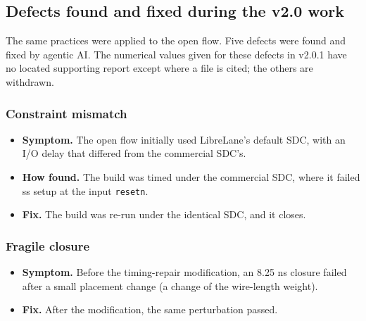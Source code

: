 \documentclass[11pt,letterpaper]{article}
\newcommand{\sk}[1]{\texttt{#1}}
\renewcommand{\_}{\textunderscore\penalty0\hskip0pt\relax}
\begin{document}
\subsection*{Defects found and fixed during the v2.0 work}\label{sec:v2defects}
The same practices were applied to the open flow. Five defects were found and fixed by agentic AI. The numerical values given for these defects in v2.0.1 have no located supporting report except where a file is cited; the others are withdrawn.

\subsubsection*{Constraint mismatch}
\begin{itemize}
\item \textbf{Symptom.} The open flow initially used LibreLane's default SDC, with an I/O delay that differed from the commercial SDC's.
\item \textbf{How found.} The build was timed under the commercial SDC, where it failed ss setup at the input \sk{resetn}.
\item \textbf{Fix.} The build was re-run under the identical SDC, and it closes.
\end{itemize}

\subsubsection*{Fragile closure}
\begin{itemize}
\item \textbf{Symptom.} Before the timing-repair modification, an 8.25 ns closure failed after a small placement change (a change of the wire-length weight).
\item \textbf{Fix.} After the modification, the same perturbation passed.
\end{itemize}
\end{document}
